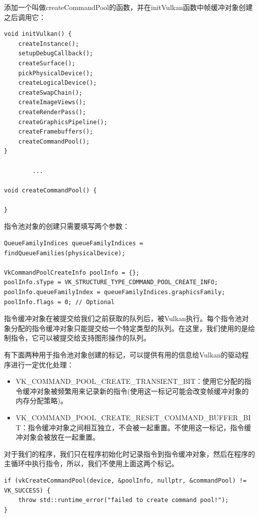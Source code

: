 \documentclass{ctexart}
\begin{document}
添加一个叫做createCommandPool的函数，并在initVulkan函数中帧缓冲对象创建之后调用它：

\begin{lstlisting}[language={[ANSI]C}]
void initVulkan() {
	createInstance();
	setupDebugCallback();
	createSurface();
	pickPhysicalDevice();
	createLogicalDevice();
	createSwapChain();
	createImageViews();
	createRenderPass();
	createGraphicsPipeline();
	createFramebuffers();
	createCommandPool();
}

		...

void createCommandPool() {

}
\end{lstlisting}

指令池对象的创建只需要填写两个参数：

\begin{lstlisting}[language={[ANSI]C}]
QueueFamilyIndices queueFamilyIndices = findQueueFamilies(physicalDevice);

VkCommandPoolCreateInfo poolInfo = {};
poolInfo.sType = VK_STRUCTURE_TYPE_COMMAND_POOL_CREATE_INFO;
poolInfo.queueFamilyIndex = queueFamilyIndices.graphicsFamily;
poolInfo.flags = 0; // Optional
\end{lstlisting}

指令缓冲对象在被提交给我们之前获取的队列后，被Vulkan执行。每个指令池对象分配的指令缓冲对象只能提交给一个特定类型的队列。在这里，我们使用的是绘制指令，它可以被提交给支持图形操作的队列。

有下面两种用于指令池对象创建的标记，可以提供有用的信息给Vulkan的驱动程序进行一定优化处理：

\begin{itemize}
	\item VK\_COMMAND\_POOL\_CREATE\_TRANSIENT\_BIT：使用它分配的指令缓冲对象被频繁用来记录新的指令(使用这一标记可能会改变帧缓冲对象的内存分配策略)。
	\item VK\_COMMAND\_POOL\_CREATE\_RESET\_COMMAND\_BUFFER\_BIT：指令缓冲对象之间相互独立，不会被一起重置。不使用这一标记，指令缓冲对象会被放在一起重置。
\end{itemize}

对于我们的程序，我们只在程序初始化时记录指令到指令缓冲对象，然后在程序的主循环中执行指令，所以，我们不使用上面这两个标记。

\begin{lstlisting}[language={[ANSI]C}]
if (vkCreateCommandPool(device, &poolInfo, nullptr, &commandPool) != VK_SUCCESS) {
	throw std::runtime_error("failed to create command pool!");
}
\end{lstlisting}
\end{document}

